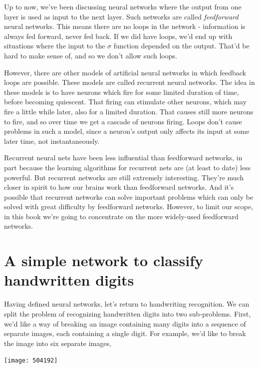 Up to now, we've been discussing neural networks where the output from one layer is used as input to the next layer. Such networks are called \textit{feedforward} neural networks. This means there are no loops in the network - information is always fed forward, never fed back. If we did have loops, we'd end up with situations where the input to the $\sigma$ function depended on the output. That'd be hard to make sense of, and so we don't allow such loops.

However, there are other models of artificial neural networks in which feedback loops are possible. These models are called recurrent neural networks\cite{WikiPediaRNN2019}. The idea in these models is to have neurons which fire for some limited duration of time, before becoming quiescent. That firing can stimulate other neurons, which may fire a little while later, also for a limited duration. That causes still more neurons to fire, and so over time we get a cascade of neurons firing. Loops don't cause problems in such a model, since a neuron's output only affects its input at some later time, not instantaneously.

Recurrent neural nets have been less influential than feedforward networks, in part because the learning algorithms for recurrent nets are (at least to date) less powerful. But recurrent networks are still extremely interesting. They're much closer in spirit to how our brains work than feedforward networks. And it's possible that recurrent networks can solve important problems which can only be solved with great difficulty by feedforward networks. However, to limit our scope, in this book we're going to concentrate on the more widely-used feedforward networks.

\section{A simple network to classify handwritten digits}

Having defined neural networks, let's return to handwriting recognition. We can split the problem of recognizing handwritten digits into two sub-problems. First, we'd like a way of breaking an image containing many digits into a sequence of separate images, each containing a single digit. For example, we'd like to break the image into six separate images,

\begin{marginfigure}
\texttt{[image: 504192]}
\end{marginfigure}

